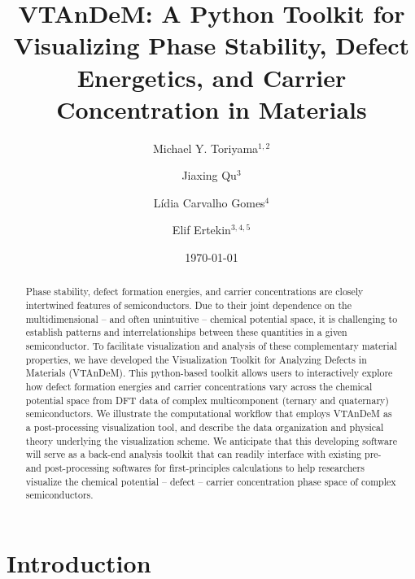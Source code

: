 \documentclass[%
 reprint,
 amsmath,amssymb,
 aps,
]{revtex4-1}
\begin{document}

\title{VTAnDeM: A Python Toolkit for Visualizing Phase Stability, Defect Energetics, and Carrier Concentration in Materials}

\author{Michael Y. Toriyama$^{1,2}$}
\author{Jiaxing Qu$^{3}$}
\author{L\'idia Carvalho Gomes$^{4}$}
\author{Elif Ertekin$^{3,4,5}$}


\date{\today}

\begin{abstract}
Phase stability, defect formation energies, and carrier concentrations are closely intertwined features of semiconductors. 
Due to their joint dependence on the multidimensional -- and often unintuitive --  chemical potential space, it is challenging to establish patterns and interrelationships between these quantities in a given semiconductor. 
To facilitate visualization and analysis of  these complementary material properties, we have developed the Visualization Toolkit for Analyzing Defects in Materials (VTAnDeM). 
This python-based toolkit allows users to interactively explore how defect formation energies and carrier concentrations vary across the chemical potential space from DFT data of complex multicomponent (ternary and quaternary) semiconductors.
We illustrate the computational workflow that employs VTAnDeM as a post-processing visualization tool, and describe the data organization and physical theory underlying the visualization scheme.
We anticipate that this developing software will serve as a back-end analysis toolkit that can readily interface with existing pre- and post-processing softwares for first-principles calculations to help researchers visualize the chemical potential -- defect -- carrier concentration phase space of complex semiconductors.
\end{abstract}

\maketitle

\section{Introduction}
\end{document}
